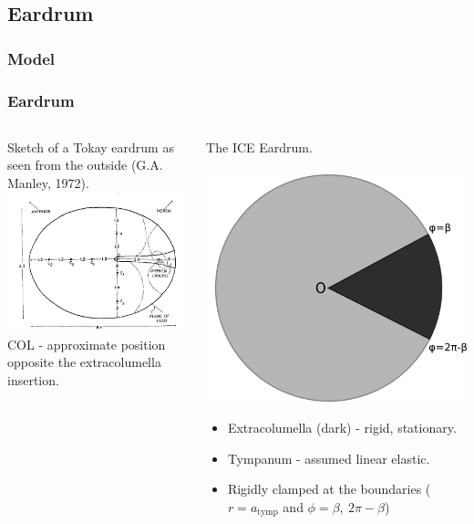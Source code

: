 \documentclass{beamer}
\begin{document}
\subsection{Eardrum}
\subsubsection{Model}
\begin{frame}[t]
\frametitle{Eardrum}
\begin{columns}
    \begin{column}{0.5\textwidth}
      \centering
      \small
      Sketch of a Tokay eardrum as seen from the outside (G.A. Manley, 1972).\\
      \includegraphics[width = 3.7 cm]{Diagrams/geckoear.png}\\
      \small
     COL - approximate position opposite the extracolumella insertion.
    \end{column}

    \begin{column}{0.5\textwidth}
      \centering
      \small
      The ICE Eardrum.\\
      \textbf{}\\
      \includegraphics[width = 3.2 cm]{Diagrams/tympanummodel.png}\\
\small
\begin{itemize}
      \item[] Extracolumella (dark) - rigid, stationary.
      \item[] Tympanum - assumed linear elastic.
      \item[] Rigidly clamped at the boundaries ($r=a_{\mathrm{tymp}}$ and $\phi=\beta,\ 2\pi-\beta$)
\end{itemize}

    \end{column}
  \end{columns}
  
\end{frame}
\end{document}
